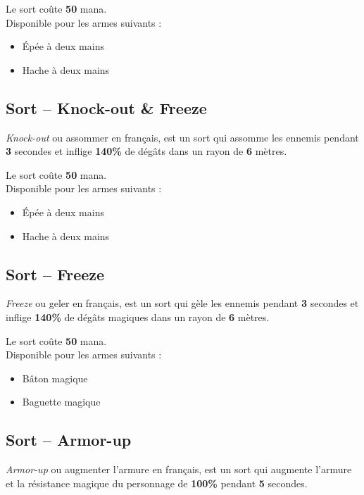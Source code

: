 \documentclass[11pt, a4paper, oneside]{report}
\begin{document}
Le sort coûte \textbf{50} mana.\\

Disponible pour les armes suivants :
\begin{multicols}{2}
\begin{itemize}
    \item Épée à deux mains
    \item Hache à deux mains
\end{itemize}
\end{multicols}
\subsection{Sort -- Knock-out \& Freeze}
\emph{Knock-out} ou assommer en français, est un sort qui assomme les ennemis pendant \textbf{3} secondes et inflige \textbf{140\%} de dégâts dans un rayon de \textbf{6} mètres.

Le sort coûte \textbf{50} mana.\\

Disponible pour les armes suivants :
\begin{multicols}{2}
\begin{itemize}
    \item Épée à deux mains
    \item Hache à deux mains
\end{itemize}
\end{multicols}
\subsection{Sort -- Freeze}
\emph{Freeze} ou geler en français, est un sort qui gèle les ennemis pendant \textbf{3} secondes et inflige \textbf{140\%} de dégâts magiques dans un rayon de \textbf{6} mètres.

Le sort coûte \textbf{50} mana.\\

Disponible pour les armes suivants :
\begin{multicols}{2}
\begin{itemize}
    \item Bâton magique
    \item Baguette magique
\end{itemize}
\end{multicols}
\subsection{Sort -- Armor-up}
\emph{Armor-up} ou augmenter l'armure en français, est un sort qui augmente l'armure et la résistance magique du personnage de \textbf{100\%} pendant \textbf{5} secondes.
\end{document}
